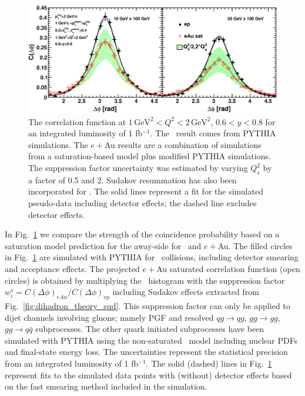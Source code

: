 \begin{figure}[hbt]
\begin{center}
\includegraphics[width=1.0\textwidth]{plots/chpt6/Q2_1_y_0.7_varying_Qs_uncertainty_Sud_withfit_smear.eps} 
\end{center} 
\caption[The predicted discrimination power of the dihadron correlation function in \ep\ and \eA\ at EIC energy scale under a reasonable statistical uncertainty]{The correlation
function at $1\, \textrm{GeV}^{2}<Q^{2}<2 \, \textrm{GeV}^{2}$, $0.6<y<0.8$ for an  
integrated luminosity of 1 fb$^{-1}$. The \ep\ result comes from PYTHIA simulations.
The $e+$Au results are a combination of simulations from a saturation-based model plus modified
PYTHIA simulations. The suppression factor uncertainty was estimated by varying
$Q_{s}^{2}$ by a factor of 0.5 and 2. Sudakov resummation has also been incorporated
for \eAu. The solid lines represent a fit for the simulated pseudo-data
including detector effects; the dashed line excludes detector effects.}
\label{fig:correUncertainSud}
\end{figure}

In Fig.~\ref{fig:correUncertainSud} we compare the strength of the
coincidence probability based on a saturation model prediction for
the away-side for \ep\ and $e+$Au. The filled circles in
Fig.~\ref{fig:correUncertainSud} are simulated with PYTHIA
for \ep\ collisions, including detector smearing and acceptance effects.
The projected $e+$Au saturated correlation function (open circles) is
obtained by multiplying the \ep\ histogram with the suppression factor
$w^{s}_{i}=C(\Delta\phi)_{eAu}/C(\Delta\phi)_{ep}$ including Sudakov effects extracted
from Fig.~\ref{fig:dihadron_theory_sud}. This suppression factor can only be applied to
dijet channels involving gluons; namely PGF and resolved $qg\rightarrow qg$,
$gg\rightarrow gg$, $gg\rightarrow q\bar q$ subprocesses. The other quark
initiated subprocesses have been simulated with PYTHIA using the non-saturated
\eA\ model including nuclear PDFs and final-state energy loss. The uncertainties
represent the statistical precision from an integrated luminosity of 1
fb$^{-1}$. The solid (dashed) lines in Fig.~\ref{fig:correUncertainSud} represent
fits to the simulated data points with (without) detector effects based on the fast smearing
method included in the simulation.

